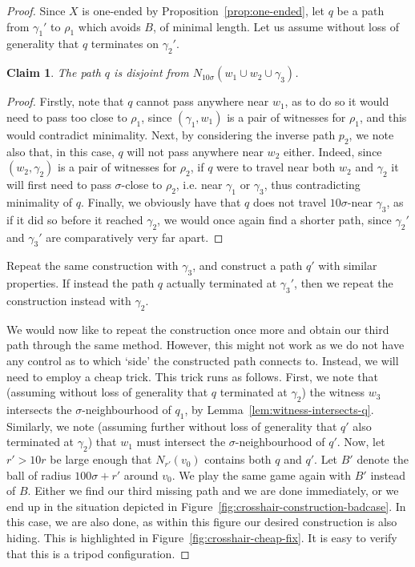 \documentclass[11pt,a4paper]{amsart}
\newtheorem{claim}[theorem]{Claim}
\theoremstyle{definition}
\begin{document}
\begin{proof}
    Since $X$ is one-ended by Proposition~\ref{prop:one-ended}, let $q$ be a path from $\gamma_{1}'$ to $\rho_1$ which avoids $B$, of minimal length. Let us assume without loss of generality that $q$ terminates on $\gamma_2'$. 

    \begin{claim}
        The path $q$ is disjoint from $N_{10\sigma}(w_{1} \cup w_2 \cup \gamma_3)$.
    \end{claim}

    \begin{proof}
         Firstly, note that $q$ cannot pass anywhere near $w_1$, as to do so it would need to pass too close to $\rho_1$, since $(\gamma_1, w_1)$ is a pair of witnesses for $\rho_1$, and this would contradict minimality.
        Next, by considering the inverse path $p_2$, we note also that, in this case, $q$ will not pass anywhere near $w_2$ either. Indeed, since $(w_2, \gamma_2)$ is a pair of witnesses for $\rho_2$, if $q$ were to travel near both $w_2$ and $\gamma_2$ it will first need to pass $\sigma$-close to $\rho_2$, i.e. near $\gamma_1$ or $\gamma_3$, thus contradicting minimality of $q$. 
        Finally, we obviously have that $q$ does not travel $10\sigma$-near $\gamma_3$, as if it did so before it reached $\gamma_2$, we would once again find a shorter path, since $\gamma_2'$ and $\gamma_3'$ are comparatively very far apart. 
    \end{proof}

    
    Repeat the same construction with $\gamma_3$, and construct a path $q'$ with similar properties. If instead the path $q$ actually terminated at $\gamma_3'$, then we repeat the construction instead with $\gamma_2$. 

    We would now like to repeat the construction once more and obtain our third path through the same method. However, this might not work as we do not have any control as to which `side' the constructed path connects to. Instead, we will need to employ a cheap trick.    
    This trick runs as follows. First, we note that (assuming without loss of generality that $q$ terminated at $\gamma_2$)  the witness $w_3$ intersects the $\sigma$-neighbourhood of $q_1$, by Lemma~\ref{lem:witness-intersects-q}.
    Similarly, we note (assuming further without loss of generality that $q'$ also terminated at $\gamma_2$) that $w_1$ must intersect the $\sigma$-neighbourhood of $q'$.
    Now, let $r' > 10r$ be large enough that $N_{r'}(v_0)$ contains both $q$ and $q'$. Let $B'$ denote the ball of radius $100\sigma + r'$ around $v_0$. We play the same game again with $B'$ instead of $B$. Either we find our third missing path and we are done immediately, or we end up in the situation depicted in Figure~\ref{fig:crosshair-construction-badcase}. In this case, we are also done, as within this figure our desired construction is also hiding. This is highlighted in Figure~\ref{fig:crosshair-cheap-fix}. It is easy to verify that this is a tripod configuration.
\end{proof}
\end{document}
